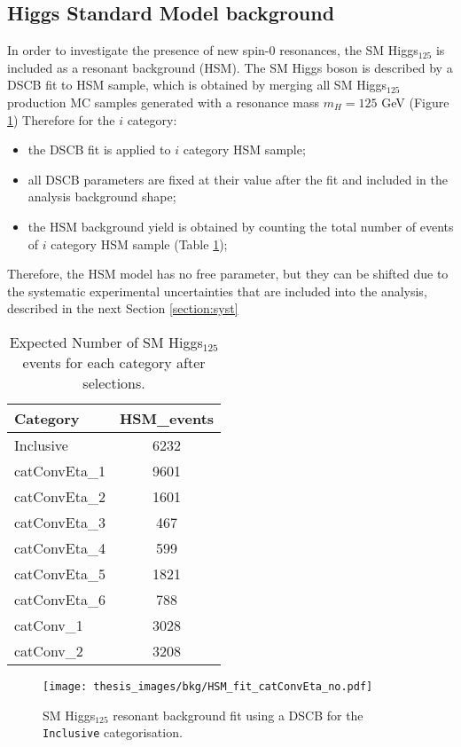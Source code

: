 \documentclass[a4paper, oneside, 11pt, openright]{book}
\begin{document}
 			\subsection{Higgs Standard Model background}
 				In order to investigate the presence of new spin-0 resonances, the SM Higgs$_{125}$ is included as a resonant background (HSM). The SM Higgs boson is described by a DSCB fit to HSM sample, which is obtained by merging all SM Higgs$_{125}$ production MC samples generated with a resonance mass $m_H=125$ GeV (Figure \ref{fig:HSM_fit}) Therefore for the $i$ category:
 				\begin{itemize}
 					\item the DSCB fit is applied to $i$ category HSM sample;
 					\item all DSCB parameters are fixed at their value after the fit and included in the analysis background shape;
 					\item the HSM background yield is obtained by counting the total number of events of $i$ category HSM sample (Table \ref{tab:HSM});
 				\end{itemize}  
 				Therefore, the HSM model has no free parameter, but they can be shifted due to the systematic experimental uncertainties that are included into the analysis, described in the next Section \ref{section:syst}
 				\begin{table}
 					\centering
						\begin{tabular}{lc}
							\toprule[1.5pt]
							Category &  HSM\_events \\
							\midrule
							Inclusive & 6232 \\
							\midrule
							catConvEta\_1 & 9601 \\
							catConvEta\_2 & 1601 \\
							catConvEta\_3 & 467 \\
							catConvEta\_4 & 599 \\
							catConvEta\_5 & 1821 \\
							catConvEta\_6 & 788 \\
							\midrule
							catConv\_1 & 3028 \\
							catConv\_2 & 3208 \\
							\bottomrule[1.5pt]
						\end{tabular}
 					\caption{Expected Number of SM Higgs$_{125}$ events for each category after selections.}
 					\label{tab:HSM}
 				\end{table}
 				\begin{figure}[]
 					\centering
 					\texttt{[image: thesis\_images/bkg/HSM\_fit\_catConvEta\_no.pdf]}
 					\caption{SM Higgs$_{125}$ resonant background fit using a DSCB for the \texttt{Inclusive} categorisation.}
 					\label{fig:HSM_fit}
 				\end{figure}
 			
\end{document}
